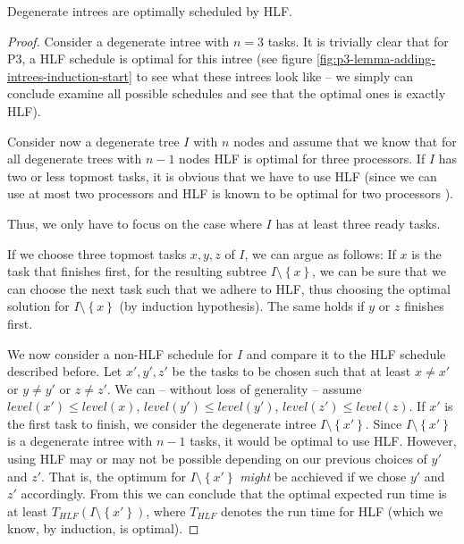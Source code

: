 \begin{theorem}
  Degenerate intrees are optimally scheduled by HLF.
\end{theorem}

\begin{proof}
  Consider a degenerate intree with $n=3$ tasks. It is trivially clear that for P3, a HLF schedule is optimal for this intree (see figure \ref{fig:p3-lemma-adding-intrees-induction-start} to see what these intrees look like -- we simply can conclude examine all possible schedules and see that the optimal ones is exactly HLF).
  
  Consider now a degenerate tree $I$ with $n$ nodes and assume that we know that for all degenerate trees with $n-1$ nodes HLF is optimal for three processors. If $I$ has two or less topmost tasks, it is obvious that we have to use HLF (since we can use at most two processors and HLF is known to be optimal for two processors ).

  Thus, we only have to focus on the case where $I$ has at least three ready tasks.

  If we choose three topmost tasks $x,y,z$ of $I$, we can argue as follows: If $x$ is the task that finishes first, for the resulting subtree $I\setminus \left\{ x \right\}$, we can be sure that we can choose the next task such that we adhere to HLF, thus choosing the optimal solution for $I\setminus\left\{ x \right\}$ (by induction hypothesis). The same holds if $y$ or $z$ finishes first.
  
  We now consider a non-HLF schedule for $I$ and compare it to the HLF schedule described before.
  Let $x',y',z'$ be the tasks to be chosen such that at least $x\neq x'$ or $y\neq y'$ or $z\neq z'$. We can -- without loss of generality -- assume $level(x')\leq level(x)$, $level(y')\leq level(y')$, $level(z')\leq level(z)$. If $x'$ is the first task to finish, we consider the degenerate intree $I\setminus\left\{ x' \right\}$. Since $I \setminus \left\{ x' \right\}$ is a degenerate intree with $n-1$ tasks, it would be optimal to use HLF. However, using HLF may or may not be possible depending on our previous choices of $y'$ and $z'$. That is, the optimum for $I\setminus\left\{ x' \right\}$ \emph{might} be acchieved if we chose $y'$ and $z'$ accordingly. From this we can conclude that the optimal expected run time is at least $T_{HLF}\left( I\setminus\left\{ x' \right\} \right)$, where $T_{HLF}$ denotes the run time for HLF (which we know, by induction, is optimal).


\end{proof}

